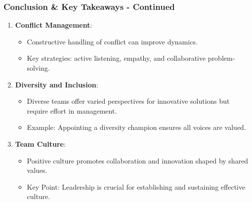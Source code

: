 \documentclass[aspectratio=169]{beamer}
\begin{document}
\begin{frame}[fragile]
    \frametitle{Conclusion \& Key Takeaways - Continued}
    \begin{enumerate}[resume]
        \item \textbf{Conflict Management}:
        \begin{itemize}
            \item Constructive handling of conflict can improve dynamics. 
            \item Key strategies: active listening, empathy, and collaborative problem-solving.
        \end{itemize}
        
        \item \textbf{Diversity and Inclusion}:
        \begin{itemize}
            \item Diverse teams offer varied perspectives for innovative solutions but require effort in management.
            \item Example: Appointing a diversity champion ensures all voices are valued.
        \end{itemize}
        
        \item \textbf{Team Culture}:
        \begin{itemize}
            \item Positive culture promotes collaboration and innovation shaped by shared values.
            \item Key Point: Leadership is crucial for establishing and sustaining effective culture.
        \end{itemize}
    \end{enumerate}
\end{frame}
\end{document}
